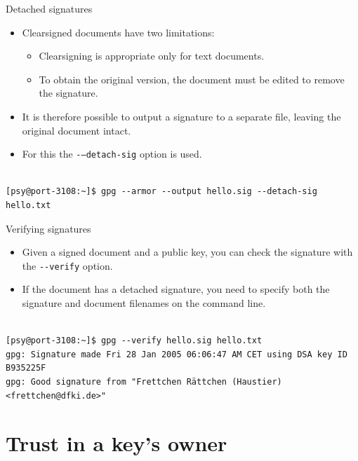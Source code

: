 \documentclass[%
mode=present,%
paper=smartboard,
size=20pt,
]{powerdot}
\newcommand{\clopt}[1]{\texttt{{-}#1}}
\begin{document}
\begin{slide}[method=direct]{Detached signatures}
  \begin{itemize}
  \item Clearsigned documents have two limitations:
    \begin{itemize}
    \item Clearsigning is appropriate only for text documents.
    \item To obtain the original version, the document must be edited
      to remove the signature.
    \end{itemize}
  \item It is therefore possible to output a signature to a separate
    file, leaving the original document intact.
  \item For this the \clopt{--detach-sig} option is used.
  \end{itemize}
\begin{verbatim}

[psy@port-3108:~]$ gpg --armor --output hello.sig --detach-sig hello.txt
\end{verbatim}
\end{slide}

\begin{slide}[method=direct]{Verifying signatures}
  \begin{itemize}
  \item Given a signed document and a public key, you can check the
    signature with the \clopt{-verify} option.
  \item If the document has a detached signature, you need to specify
    both the signature and document filenames on the command line.
  \end{itemize}
\begin{verbatim}

[psy@port-3108:~]$ gpg --verify hello.sig hello.txt
gpg: Signature made Fri 28 Jan 2005 06:06:47 AM CET using DSA key ID B935225F
gpg: Good signature from "Frettchen Rättchen (Haustier) <frettchen@dfki.de>"
\end{verbatim}%
\end{slide}

\section{Trust in a key's owner}
\end{document}
